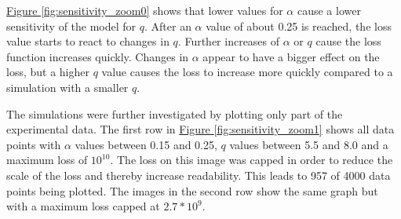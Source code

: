 \hyperref[fig:sensitivity_zoom0]{Figure \ref*{fig:sensitivity_zoom0}} shows that lower values for $\alpha$ cause a lower sensitivity of the model
for $q$. After an $\alpha$ value of about 0.25 is reached, the loss value starts to react to changes in $q$. Further
increases of $\alpha$ or $q$ cause the loss function increases quickly. Changes in $\alpha$ appear to have a bigger effect
on the loss, but a higher $q$ value causes the loss to increase more quickly compared to a simulation with a smaller $q$.\newline

The simulations were further investigated by plotting only part of the experimental data.
The first row in \hyperref[fig:sensitivity_zoom1]{Figure \ref*{fig:sensitivity_zoom1}} shows all data points with $\alpha$ values between 0.15
and 0.25, $q$ values between 5.5 and 8.0 and a maximum loss of $10^{10}$. The loss on this image was capped in order to reduce
the scale of the loss and thereby increase readability. This leads to 957 of 4000 data points being plotted. The images in the
second row show the same graph but with a maximum loss capped at $2.7*10^{9}$.\newline

